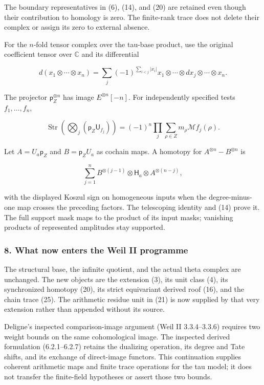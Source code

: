 The boundary representatives in (6), (14), and (20) are retained even though their contribution to
homology is zero. The finite-rank trace does not delete their complex or assign its zero to external
absence.

For the \(n\)-fold tensor complex over the tau-base product, use the original coefficient tensor
over \(\mathbb C\) and its differential

\[d(x_1\otimes\cdots\otimes x_n)=
\sum_j(-1)^{\sum_{i<j}|x_i|}
 x_1\otimes\cdots\otimes dx_j\otimes\cdots\otimes x_n.\]

The projector \(\mathsf p_Z^{\otimes n}\) has image \(E^{\otimes n}[-n]\). For independently
specified tests \(f_1,\ldots,f_n\),

\[\operatorname{Str}\left(\bigotimes_j(\mathsf p_Z\mathsf U_{f_j})\right)
=(-1)^n\prod_j\sum_{\rho\in Z}m_\rho\mathcal Mf_j(\rho).\tag{26}\]

Let \(A=U_a\mathsf p_Z\) and \(B=\mathsf p_ZU_a\) as cochain maps. A homotopy for
\(A^{\otimes n}-B^{\otimes n}\) is

\[\sum_{j=1}^nB^{\otimes(j-1)}\otimes\mathsf H_a\otimes A^{\otimes(n-j)},\]

with the displayed Koszul sign on homogeneous inputs when the degree-minus-one map crosses the
preceding factors. The telescoping identity and (14) prove it. The full support mask maps to the
product of its input masks; vanishing products of represented amplitudes stay supported.

\subsubsection{8. What now enters the Weil II
programme}\label{pr_9:what-now-enters-the-weil-ii-programme}

The structural base, the infinite quotient, and the actual theta complex are unchanged. The new
objects are the extension (3), its unit class (4), its synchronized homotopy (20), its strict
equivariant derived roof (16), and the chain trace (25). The arithmetic residue unit in (21) is now
supplied by that very extension rather than appended without its source.

Deligne's inspected comparison-image argument (Weil II 3.3.4--3.3.6) requires two weight bounds on
the same cohomological image. The inspected derived formulation (6.2.1--6.2.7) retains the dualizing
operation, its degree and Tate shifts, and its exchange of direct-image functors. This continuation
supplies coherent arithmetic maps and finite trace operations for the tau model; it does not
transfer the finite-field hypotheses or assert those two bounds.

